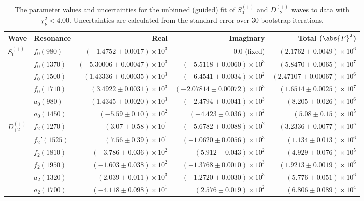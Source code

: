 \begin{table}[ht]
    \begin{center}
        \begin{tabular}{llrrr}\toprule
        Wave & Resonance & Real & Imaginary & Total ($\abs{F}^2$) \\\midrule
$S_{0}^{(+)}$ & $f_{0}(980)$ & $(-1.4752 \pm 0.0017) \times 10^{3}$ & $0.0$ (fixed) & $(2.1762 \pm 0.0049) \times 10^{6}$ \\
 & $f_{0}(1370)$ & $(-5.30006 \pm 0.00047) \times 10^{3}$ & $(-5.5118 \pm 0.0060) \times 10^{3}$ & $(5.8470 \pm 0.0065) \times 10^{7}$ \\
 & $f_{0}(1500)$ & $(1.43336 \pm 0.00035) \times 10^{3}$ & $(-6.4541 \pm 0.0034) \times 10^{2}$ & $(2.47107 \pm 0.00067) \times 10^{6}$ \\
 & $f_{0}(1710)$ & $(3.4922 \pm 0.0031) \times 10^{3}$ & $(-2.07814 \pm 0.00072) \times 10^{3}$ & $(1.6514 \pm 0.0025) \times 10^{7}$ \\
 & $a_{0}(980)$ & $(1.4345 \pm 0.0020) \times 10^{3}$ & $(-2.4794 \pm 0.0041) \times 10^{3}$ & $(8.205 \pm 0.026) \times 10^{6}$ \\
 & $a_{0}(1450)$ & $(-5.59 \pm 0.10) \times 10^{2}$ & $(-4.423 \pm 0.036) \times 10^{2}$ & $(5.08 \pm 0.15) \times 10^{5}$ \\
$D_{+2}^{(+)}$ & $f_{2}(1270)$ & $(3.07 \pm 0.58) \times 10^{1}$ & $(-5.6782 \pm 0.0088) \times 10^{2}$ & $(3.2336 \pm 0.0077) \times 10^{5}$ \\
 & $f_{2}'(1525)$ & $(7.56 \pm 0.39) \times 10^{1}$ & $(-1.0620 \pm 0.0056) \times 10^{3}$ & $(1.134 \pm 0.013) \times 10^{6}$ \\
 & $f_{2}(1810)$ & $(-3.786 \pm 0.036) \times 10^{2}$ & $(5.912 \pm 0.043) \times 10^{2}$ & $(4.929 \pm 0.076) \times 10^{5}$ \\
 & $f_{2}(1950)$ & $(-1.603 \pm 0.038) \times 10^{2}$ & $(-1.3768 \pm 0.0010) \times 10^{3}$ & $(1.9213 \pm 0.0019) \times 10^{6}$ \\
 & $a_{2}(1320)$ & $(2.039 \pm 0.011) \times 10^{3}$ & $(-1.2720 \pm 0.0030) \times 10^{3}$ & $(5.776 \pm 0.051) \times 10^{6}$ \\
 & $a_{2}(1700)$ & $(-4.118 \pm 0.098) \times 10^{1}$ & $(2.576 \pm 0.019) \times 10^{2}$ & $(6.806 \pm 0.089) \times 10^{4}$ \\\bottomrule
        \end{tabular}
    \caption{The parameter values and uncertainties for the unbinned (guided) fit of $S_{0}^{(+)}$ and $D_{+2}^{(+)}$ waves to data with $\chi^2_\nu < 4.00$. Uncertainties are calculated from the standard error over $30$ bootstrap iterations.}\label{tab:unbinned-fit-chisqdof-4.0-guided-Sp0p-Dp2p}
    \end{center}
\end{table}
